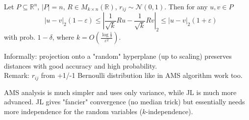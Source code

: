 \documentclass[11pt]{article}
\begin{document}
\begin{lemma}
Let $P \subseteq \mathbb{R}^n$, $|P| = n$, $R \in M_{k \times n}(\mathbb{R})$, $r_{ij} \sim \mathcal{N}(0, 1)$. Then for any $u,v \in P$
$$\quad |u-v|_2 (1 - \varepsilon) \leq \left| \frac{1}{\sqrt{k}}Ru - \frac{1}{\sqrt{k}} Rv \right|_2 \leq |u-v|_2 (1+\varepsilon)$$
with prob. $1-\delta$, where $k = O \left( \frac{\log{\frac{1}{\delta}}}{\varepsilon^2}\right)$.
\end{lemma}

Informally: projection onto a "random" hyperplane (up to scaling) preserves distances with good accuracy and high probability. \\
Remark: $r_{ij}$ from +1/-1 Bernoulli distribution like in AMS algorithm work too. \cite{DBLP:journals/jcss/Achlioptas03}

AMS analysis is much simpler and uses only variance, while JL is much more advanced. JL gives "fancier" convergence (no median trick) but essentially needs more independence for the random variables ($k$-independence).



\end{document}
